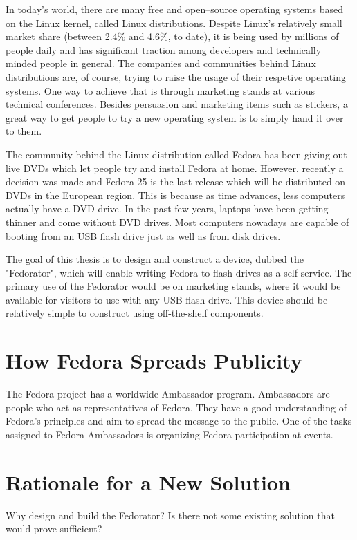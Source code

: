 \label{Introduction}
    In today's world, there are many free and open–source operating systems based on the Linux kernel, called Linux distributions\cite{whatislinux}.  Despite Linux's relatively small market share (between 2.4\% and 4.6\%, to date\cite{linuxmarketshare}), it is being used by millions of people daily and has significant traction among developers\cite{sosurvey} and technically minded people in general.  The companies and communities behind Linux distributions are, of course, trying to raise the usage of their respetive operating systems.  One way to achieve that is through marketing stands at various technical conferences.  Besides persuasion and marketing items such as stickers, a great way to get people to try a new operating system is to simply hand it over to them.

    The community behind the Linux distribution called Fedora\cite{fedora} has been giving out live DVDs which let people try and install Fedora at home.  However, recently a decision was made and Fedora 25 is the last release which will be distributed on DVDs in the European region.  This is because as time advances, less computers actually have a DVD drive.  In the past few years, laptops have been getting thinner and come without DVD drives\cite{laptopdvd}.  Most computers nowadays are capable of booting from an USB flash drive just as well as from disk drives.
    
    The goal of this thesis is to design and construct a device, dubbed the "Fedorator", which will enable writing Fedora to flash drives as a self-service.  The primary use of the Fedorator would be on marketing stands, where it would be available for visitors to use with any USB flash drive.  This device should be relatively simple to construct using off-the-shelf components.
    \section{How Fedora Spreads Publicity}
        The Fedora project has a worldwide Ambassador program.  Ambassadors are people who act as representatives of Fedora.  They have a good understanding of Fedora's principles and aim to spread the message to the public\cite{fedora-ambassadors}.  One of the tasks assigned to Fedora Ambassadors is organizing Fedora participation at events.
        \blind[3]
    \section{Rationale for a New Solution}
        Why design and build the Fedorator?  Is there not some existing solution that would prove sufficient?
        
